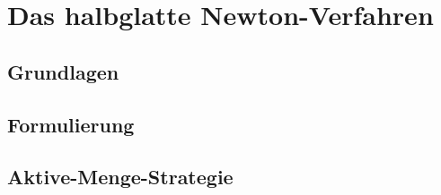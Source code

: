 \chapter{Das halbglatte Newton-Verfahren}

\section{Grundlagen}


\section{Formulierung}


\section{Aktive-Menge-Strategie}

